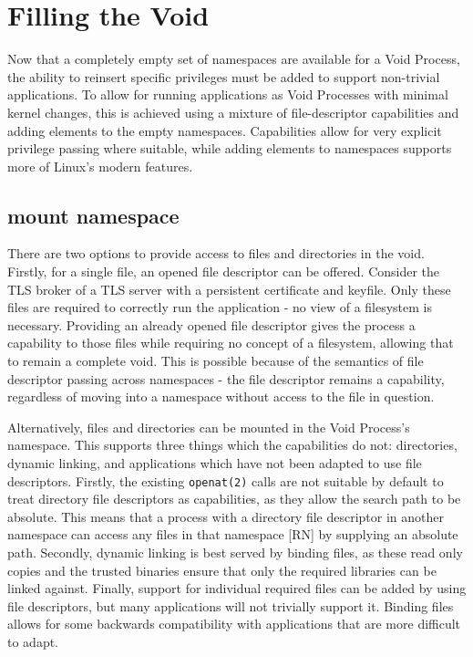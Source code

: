 \documentclass[12pt,a4paper,twoside]{report}
\begin{document}
\chapter{Filling the Void}
\label{chap:filling-the-void}

Now that a completely empty set of namespaces are available for a Void Process, the ability to reinsert specific privileges must be added to support non-trivial applications. To allow for running applications as Void Processes with minimal kernel changes, this is achieved using a mixture of file-descriptor capabilities and adding elements to the empty namespaces. Capabilities allow for very explicit privilege passing where suitable, while adding elements to namespaces supports more of Linux's modern features.

\section{mount namespace}
\label{sec:filling-mount}

There are two options to provide access to files and directories in the void. Firstly, for a single file, an opened file descriptor can be offered. Consider the TLS broker of a TLS server with a persistent certificate and keyfile. Only these files are required to correctly run the application - no view of a filesystem is necessary. Providing an already opened file descriptor gives the process a capability to those files while requiring no concept of a filesystem, allowing that to remain a complete void. This is possible because of the semantics of file descriptor passing across namespaces - the file descriptor remains a capability, regardless of moving into a namespace without access to the file in question.

Alternatively, files and directories can be mounted in the Void Process's namespace. This supports three things which the capabilities do not: directories, dynamic linking, and applications which have not been adapted to use file descriptors. Firstly, the existing \texttt{openat(2)} calls are not suitable by default to treat directory file descriptors as capabilities, as they allow the search path to be absolute. This means that a process with a directory file descriptor in another namespace can access any files in that namespace [RN] by supplying an absolute path. Secondly, dynamic linking is best served by binding files, as these read only copies and the trusted binaries ensure that only the required libraries can be linked against. Finally, support for individual required files can be added by using file descriptors, but many applications will not trivially support it. Binding files allows for some backwards compatibility with applications that are more difficult to adapt.
\end{document}
